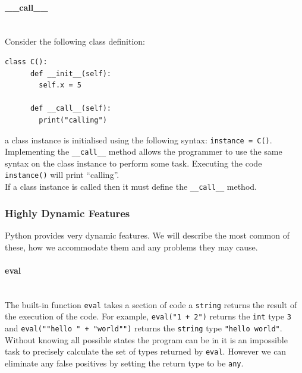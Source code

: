 \documentclass[12pt, titlepage]{article}
\begin{document}
\paragraph*{\_\_call\_\_} \mbox{} \\
Consider the following class definition:
\begin{lstlisting}[mathescape]
    class C():
      def __init__(self):
        self.x = 5
			
      def __call__(self):
        print("calling")
\end{lstlisting}
a class instance is initialised using the following syntax: \texttt{instance = C()}. Implementing the \texttt{\_\_call\_\_} method allows the programmer to use the same syntax on the class instance to perform some task. Executing the code \texttt{instance()} will print ``calling''. \\
\indent If a class instance is called then it must define the \texttt{\_\_call\_\_} method.


\subsubsection{Highly Dynamic Features}
Python provides very dynamic features. We will describe the most common of these, how we accommodate them and any problems they may cause. 
\paragraph*{eval}\mbox{} \\
The built-in function \texttt{eval} takes a section of code a \texttt{string} returns the result of the execution of the code. For example, \texttt{eval("1 + 2")} returns the \texttt{int} type \texttt{3} and  \texttt{eval(""hello " + "world"")} returns the \texttt{string} type \texttt{"hello world"}. Without knowing all possible states the program can be in it is an impossible task to precisely calculate the set of types returned by \texttt{eval}. However we can eliminate any false positives by setting the return type to be \texttt{any}.
\end{document}
